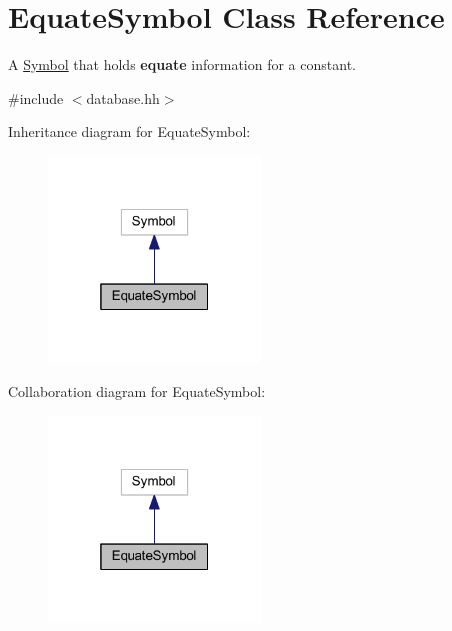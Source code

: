 \hypertarget{class_equate_symbol}{}\section{Equate\+Symbol Class Reference}
\label{class_equate_symbol}


A \mbox{\hyperlink{class_symbol}{Symbol}} that holds {\bfseries{equate}} information for a constant.  




{\ttfamily \#include $<$database.\+hh$>$}



Inheritance diagram for Equate\+Symbol\+:
\nopagebreak
\begin{figure}[H]
\begin{center}
\leavevmode
\includegraphics[width=160pt]{class_equate_symbol__inherit__graph}
\end{center}
\end{figure}


Collaboration diagram for Equate\+Symbol\+:
\nopagebreak
\begin{figure}[H]
\begin{center}
\leavevmode
\includegraphics[width=160pt]{class_equate_symbol__coll__graph}
\end{center}
\end{figure}

